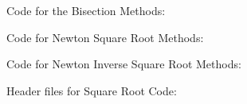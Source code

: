 Code for the Bisection Methods:


Code for Newton Square Root Methods:


Code for Newton Inverse Square Root Methods:


Header files for Square Root Code:




